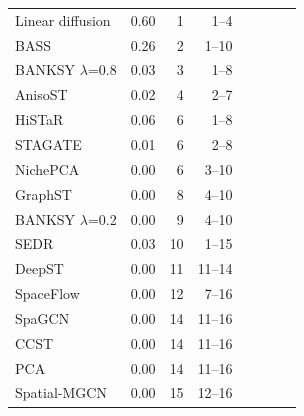 \begin{tabular}{lrrrrrrl}
Linear diffusion & 0.60 & 1 & 1--4 &  &  &  &  \\
BASS & 0.26 & 2 & 1--10 &  &  &  &  \\
BANKSY $\lambda$=0.8 & 0.03 & 3 & 1--8 &  &  &  &  \\
AnisoST & 0.02 & 4 & 2--7 &  &  &  &  \\
HiSTaR & 0.06 & 6 & 1--8 &  &  &  &  \\
STAGATE & 0.01 & 6 & 2--8 &  &  &  &  \\
NichePCA & 0.00 & 6 & 3--10 &  &  &  &  \\
GraphST & 0.00 & 8 & 4--10 &  &  &  &  \\
BANKSY $\lambda$=0.2 & 0.00 & 9 & 4--10 &  &  &  &  \\
SEDR & 0.03 & 10 & 1--15 &  &  &  &  \\
DeepST & 0.00 & 11 & 11--14 &  &  &  &  \\
SpaceFlow & 0.00 & 12 & 7--16 &  &  &  &  \\
SpaGCN & 0.00 & 14 & 11--16 &  &  &  &  \\
CCST & 0.00 & 14 & 11--16 &  &  &  &  \\
PCA & 0.00 & 14 & 11--16 &  &  &  &  \\
Spatial-MGCN & 0.00 & 15 & 12--16 &  &  &  &  \\
\bottomrule
\end{tabular}
